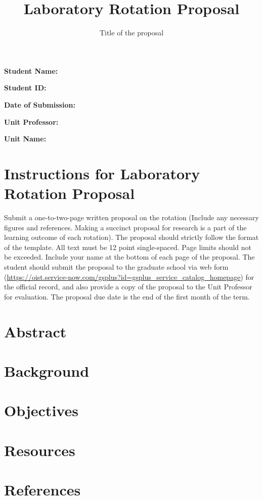 \documentclass[paper=a4wide, fontsize=12pt]{scrartcl}	 %
\title{\vspace{-1.8cm}  \color{DarkRed} Laboratory Rotation Proposal}
\subtitle{Title of the proposal %
\vspace{-2cm} }
\date{} %
\begin{document}
\maketitle %
\thispagestyle{fancy} %


\vspace{-0.5cm} \textbf{Student Name:}

\textbf{Student ID:}

\textbf{Date of Submission:}

\textbf{Unit Professor:}

\textbf{Unit Name:}


\section*{Instructions for Laboratory Rotation Proposal}

Submit a one-to-two-page written proposal on the rotation (Include any necessary figures and references. Making a succinct proposal for research is a part of the learning outcome of each rotation). The proposal should strictly follow the format of the template. All text must be 12 point single-spaced. Page limits should not be exceeded. Include your name at the bottom of each page of the proposal. 
The student should submit the proposal to the graduate school via web form (\url{https://oist.service-now.com/gsplus?id=gsplus_service_catalog_homepage}) for the official record, and also provide a copy of the proposal to the Unit Professor for evaluation. The proposal due date is the end of the first month of the term.

\section*{Abstract}

\section*{Background}

\section*{Objectives}

\section*{Resources}

\section*{References}
\end{document}
